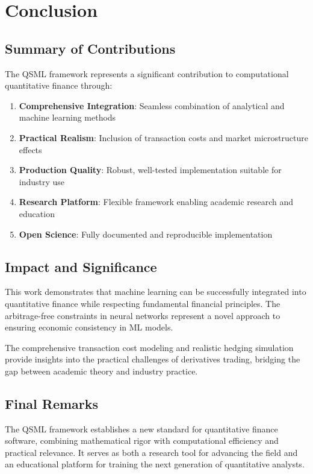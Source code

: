 \documentclass[12pt,a4paper]{article}
\begin{document}
\section{Conclusion}

\subsection{Summary of Contributions}

The QSML framework represents a significant contribution to computational quantitative finance through:

\begin{enumerate}
    \item \textbf{Comprehensive Integration}: Seamless combination of analytical and machine learning methods
    \item \textbf{Practical Realism}: Inclusion of transaction costs and market microstructure effects
    \item \textbf{Production Quality}: Robust, well-tested implementation suitable for industry use
    \item \textbf{Research Platform}: Flexible framework enabling academic research and education
    \item \textbf{Open Science}: Fully documented and reproducible implementation
\end{enumerate}

\subsection{Impact and Significance}

This work demonstrates that machine learning can be successfully integrated into quantitative finance while respecting fundamental financial principles. The arbitrage-free constraints in neural networks represent a novel approach to ensuring economic consistency in ML models.

The comprehensive transaction cost modeling and realistic hedging simulation provide insights into the practical challenges of derivatives trading, bridging the gap between academic theory and industry practice.

\subsection{Final Remarks}

The QSML framework establishes a new standard for quantitative finance software, combining mathematical rigor with computational efficiency and practical relevance. It serves as both a research tool for advancing the field and an educational platform for training the next generation of quantitative analysts.
\end{document}
